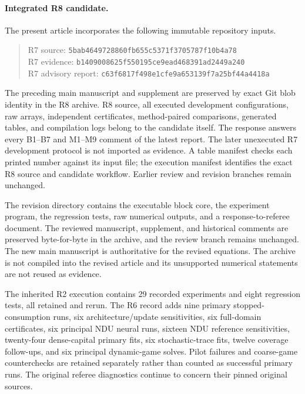 \documentclass[ecta,draft]{econsocart}
\theoremstyle{definition}
\theoremstyle{remark}
\begin{document}
\begin{appendix}
\paragraph*{Integrated R8 candidate.}
The present article incorporates the following immutable repository inputs.
\begin{quote}\small
R7 source: \texttt{5bab4649\allowbreak 728860fb\allowbreak 655c5371\allowbreak f3705787\allowbreak f10b4a78}\\
R7 evidence: \texttt{b1409008\allowbreak 625f5501\allowbreak 95ce9ead\allowbreak 468391ad\allowbreak 2449a240}\\
R7 advisory report: \texttt{c63f6817\allowbreak f498e1cf\allowbreak e9a65313\allowbreak 9f7a25bf\allowbreak 44a4418a}
\end{quote}
The preceding main manuscript and supplement are preserved by exact Git blob identity in the R8 archive. R8 source, all executed development configurations, raw arrays, independent certificates, method-paired comparisons, generated tables, and compilation logs belong to the candidate itself. The response answers every B1--B7 and M1--M9 comment of the latest report. The later unexecuted R7 development protocol is not imported as evidence. A table manifest checks each printed number against its input file; the execution manifest identifies the exact R8 source and candidate workflow. Earlier review and revision branches remain unchanged.

The revision directory contains the executable block core, the experiment program, the regression tests, raw numerical outputs, and a response-to-referee document. The reviewed manuscript, supplement, and historical comments are preserved byte-for-byte in the archive, and the review branch remains unchanged. The new main manuscript is authoritative for the revised equations. The archive is not compiled into the revised article and its unsupported numerical statements are not reused as evidence.

The inherited R2 execution contains 29 recorded experiments and eight regression tests, all retained and rerun. The R6 record adds nine primary stopped-consumption runs, six architecture/update sensitivities, six full-domain certificates, six principal NDU neural runs, sixteen NDU reference sensitivities, twenty-four dense-capital primary fits, six stochastic-trace fits, twelve coverage follow-ups, and six principal dynamic-game solves. Pilot failures and coarse-game counterchecks are retained separately rather than counted as successful primary runs. The original referee diagnostics continue to concern their pinned original sources.


\end{appendix}
\end{document}
